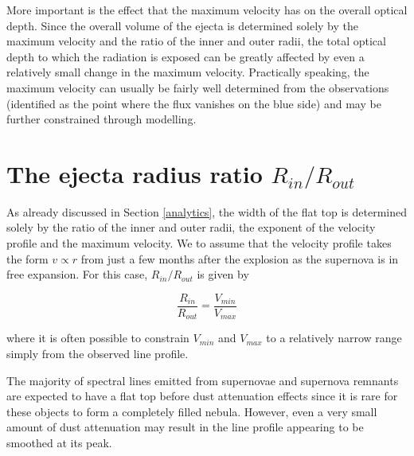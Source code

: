 More important is the effect that the maximum velocity has on the overall 
optical depth.  Since the overall volume of the ejecta is determined 
solely by the maximum velocity and the ratio of the inner and outer radii, 
the total optical depth to which the radiation is exposed can be greatly 
affected by even a relatively small change in the maximum velocity.  
Practically speaking, the maximum velocity can usually be fairly well determined 
from the observations (identified as the point where the flux vanishes 
on the blue side) and may be further constrained through modelling.

\section{The ejecta radius ratio $R_{in}/R_{out}$}

As already discussed in Section \ref{analytics}, the width of the flat top 
is determined solely by the ratio of the inner and outer radii, the 
exponent of the velocity profile and the maximum velocity.  We to 
assume that the velocity profile takes the form $v \propto r$ from 
just a few months after the explosion as the supernova is in free 
expansion.  For this case, $R_{in}/R_{out}$ is given by

\begin{equation}
\frac{R_{in}}{R_{out}}=\frac{V_{min}}{V_{max}}
\end{equation}

\noindent where it is often possible to constrain $V_{min}$ and $V_{max}$ 
to a relatively narrow range simply from the observed line profile.

The majority of spectral lines emitted from supernovae and supernova 
remnants are expected to have a flat top before dust attenuation effects since it is rare for these 
objects to form a completely filled nebula.  However, even a very small amount of 
dust attenuation may result in the line profile appearing to be smoothed at its 
peak.

